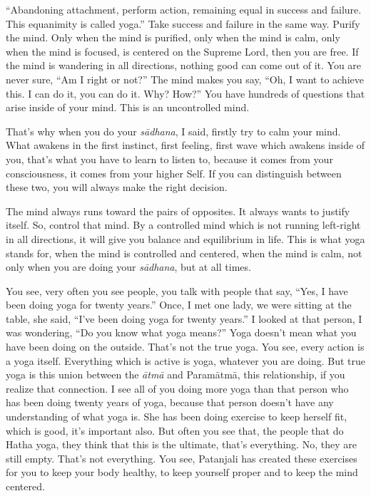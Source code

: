 “Abandoning attachment, perform action, remaining equal in success and failure. This equanimity is called yoga.” Take success and failure in the same way. Purify the mind. Only when the mind is purified, only when the mind is calm, only when the mind is focused, is centered on the Supreme Lord, then you are free. If the mind is wandering in all directions, nothing good can come out of it. You are never sure, “Am I right or not?” The mind makes you say, “Oh, I want to achieve this. I can do it, you can do it. Why? How?” You have hundreds of questions that arise inside of your mind. This is an uncontrolled mind.

That’s why when you do your \textit{sādhana}, I said, firstly try to calm your mind. What awakens in the first instinct, first feeling, first wave which awakens inside of you, that’s what you have to learn to listen to, because it comes from your consciousness, it comes from your higher Self. If you can distinguish between these two, you will always make the right decision.

The mind always runs toward the pairs of opposites. It always wants to justify itself. So, control that mind. By a controlled mind which is not running left-right in all directions, it will give you balance and equilibrium in life. This is what yoga stands for, when the mind is controlled and centered, when the mind is calm, not only when you are doing your \textit{sādhana}, but at all times.

You see, very often you see people, you talk with people that say, “Yes, I have been doing yoga for twenty years.” Once, I met one lady, we were sitting at the table, she said, “I’ve been doing yoga for twenty years.” I looked at that person, I was wondering, “Do you know what yoga means?” Yoga doesn’t mean what you have been doing on the outside. That’s not the true yoga. You see, every action is a yoga itself. Everything which is active is yoga, whatever you are doing. But true yoga is this union between the \textit{ātmā} and Paramātmā, this relationship, if you realize that connection. I see all of you doing more yoga than that person who has been doing twenty years of yoga, because that person doesn't have any understanding of what yoga is. She has been doing exercise to keep herself fit, which is good, it’s important also. But often you see that, the people that do Hatha yoga, they think that this is the ultimate, that’s everything. No, they are still empty. That’s not everything. You see, Patanjali has created these exercises for you to keep your body healthy, to keep yourself proper and to keep the mind centered.

